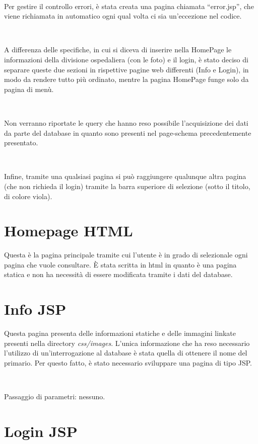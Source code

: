 \documentclass[a4paper,titlepage]{article}
\begin{document}
~

Per gestire il controllo errori, è stata creata una pagina chiamata ``error.jsp'', che viene richiamata in automatico ogni qual volta ci sia un'eccezione nel codice.

~

A differenza delle specifiche, in cui si diceva di inserire nella HomePage le informazioni della divisione ospedaliera (con le foto) e il login, è stato deciso di separare queste due sezioni in rispettive pagine web differenti (Info e Login), in modo da rendere tutto più ordinato, mentre la pagina HomePage funge solo da pagina di menù.

~

Non verranno riportate le query che hanno reso possibile l'acquisizione dei dati da parte del database in quanto sono presenti nel page-schema precedentemente presentato.

~

Infine, tramite una qualsiasi pagina si può raggiungere qualunque altra pagina (che non richieda il login) tramite la barra superiore di selezione (sotto il titolo, di colore viola).

\section{Homepage HTML}

Questa è la pagina principale tramite cui l'utente è in grado di selezionale ogni pagina che vuole consultare. È stata scritta in html in quanto è una pagina statica e non ha necessità di essere modificata tramite i dati del database.

\section{Info JSP}

Questa pagina presenta delle informazioni statiche e delle immagini linkate presenti nella directory \textit{css/images}. L'unica informazione che ha reso necessario l'utilizzo di un'interrogazione al database è stata quella di ottenere il nome del primario. Per questo fatto, è stato necessario sviluppare una pagina di tipo JSP.

~

Passaggio di parametri: nessuno.

\section{Login JSP}
\end{document}
